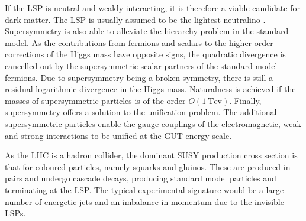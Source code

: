If the LSP is neutral and weakly interacting, 
it is therefore a viable candidate for dark matter. The LSP is usually assumed 
to be the lightest neutralino \neutralino. 
Supersymmetry is also able to alleviate the hierarchy problem in the standard 
model. As the 
contributions from fermions and scalars to the higher order corrections of the 
Higgs mass have opposite signs, the quadratic divergence is cancelled out by 
the supersymmetric scalar partners of the standard model fermions. Due to 
supersymmetry being a broken symmetry, there is still a residual logarithmic 
divergence in the Higgs mass. Naturalness is achieved if the masses of 
supersymmetric particles is of the order $O(1~\mathrm{Tev})$. 
Finally, supersymmetry offers a solution to the unification problem. The 
additional supersymmetric particles enable the gauge couplings of the 
electromagnetic, weak and strong interactions to be unified at the GUT energy 
scale.

As the LHC is a hadron collider, the dominant SUSY production cross section is 
that for coloured particles, namely squarks and gluinos. These are produced in 
pairs and undergo cascade decays, producing standard model particles and 
terminating at the LSP. The typical experimental signature would be a large 
number of energetic jets and an imbalance in momentum due to the invisible LSPs.




